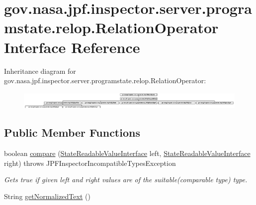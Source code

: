 \hypertarget{interfacegov_1_1nasa_1_1jpf_1_1inspector_1_1server_1_1programstate_1_1relop_1_1_relation_operator}{}\section{gov.\+nasa.\+jpf.\+inspector.\+server.\+programstate.\+relop.\+Relation\+Operator Interface Reference}
\label{interfacegov_1_1nasa_1_1jpf_1_1inspector_1_1server_1_1programstate_1_1relop_1_1_relation_operator}
Inheritance diagram for gov.\+nasa.\+jpf.\+inspector.\+server.\+programstate.\+relop.\+Relation\+Operator\+:\begin{figure}[H]
\begin{center}
\leavevmode
\includegraphics[height=0.864197cm]{interfacegov_1_1nasa_1_1jpf_1_1inspector_1_1server_1_1programstate_1_1relop_1_1_relation_operator}
\end{center}
\end{figure}
\subsection*{Public Member Functions}
\begin{DoxyCompactItemize}
\item 
boolean \hyperlink{interfacegov_1_1nasa_1_1jpf_1_1inspector_1_1server_1_1programstate_1_1relop_1_1_relation_operator_ad35e4918d8de2de096c7d8035352a3ec}{compare} (\hyperlink{interfacegov_1_1nasa_1_1jpf_1_1inspector_1_1server_1_1programstate_1_1_state_readable_value_interface}{State\+Readable\+Value\+Interface} left, \hyperlink{interfacegov_1_1nasa_1_1jpf_1_1inspector_1_1server_1_1programstate_1_1_state_readable_value_interface}{State\+Readable\+Value\+Interface} right)  throws J\+P\+F\+Inspector\+Incompatible\+Types\+Exception
\begin{DoxyCompactList}\small\item\em Gets true if given left and right values are of the suitable(comparable type) type. \end{DoxyCompactList}\item 
String \hyperlink{interfacegov_1_1nasa_1_1jpf_1_1inspector_1_1server_1_1programstate_1_1relop_1_1_relation_operator_a5e6d5f3ef3803b61f387f22ef4e036fc}{get\+Normalized\+Text} ()
\end{DoxyCompactItemize}


